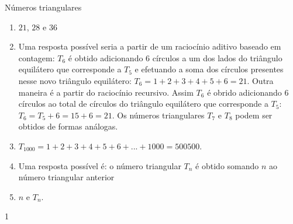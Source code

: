 \begin{answer}{Números triangulares}
{
\begin{enumerate}
\item {} 
$21$, $28$ e $36$

\item {} 
Uma resposta possível seria a partir de um raciocínio aditivo baseado em contagem: $T_6$ é obtido adicionando $6$ círculos a um dos lados do triângulo equilátero que corresponde a $T_5$ e efetuando a soma dos círculos presentes nesse novo triângulo equilátero: $T_6=1+2+3+4+5+6=21$. Outra maneira é a partir do raciocínio recursivo. Assim $T_6$ é obrido adicionando $6$ círculos ao total de círculos do triângulo equilátero que corresponde a $T_5$: $T_6=T_5+6=15+6=21$. Os números triangulares $T_7$ e $T_8$ podem ser obtidos de formas análogas.

\item {} 
$T_1000=1+2+3+4+5+6+...+1000=500500$.

\item {} 
Uma resposta possível é: o número triangular $T_n$ é obtido somando $n$ ao número triangular anterior

\item {} 
$n$ e $T_n$.

\end{enumerate}
}{1}
\end{answer}
